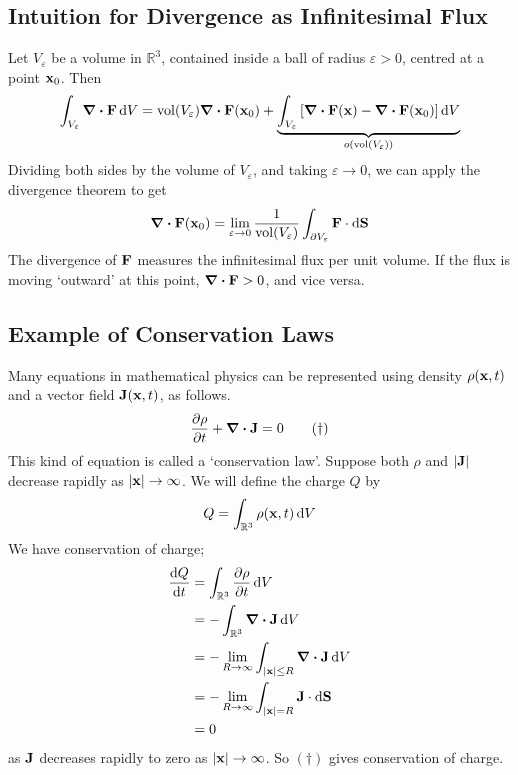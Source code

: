 \documentclass{article}
\begin{document}
\subsection{Intuition for Divergence as Infinitesimal Flux}
Let $V_\varepsilon$ be a volume in $\mathbb R^3$, contained inside a ball of radius $\varepsilon > 0$, centred at a point $\vb x_0$. Then
\[ \int_{V_\varepsilon} \div{\vb F} \dd{V} = \mathrm{vol}(V_\varepsilon) \div{\vb F}(\vb x_0) + \underbrace{\int_{V_\varepsilon}  \left[ \div{\vb F}(\vb x) - \div{\vb F}(\vb x_0) \right] \dd{V}}_{o(\mathrm{vol}(V_\varepsilon))} \]
Dividing both sides by the volume of $V_\varepsilon$, and taking $\varepsilon \to 0$, we can apply the divergence theorem to get
\[ \div{\vb F}(\vb x_0) = \lim_{\varepsilon \to 0} \frac{1}{\mathrm{vol}(V_\varepsilon)} \int_{\partial V_\varepsilon} \vb F \cdot \dd{\vb S} \]
The divergence of $\vb F$ measures the infinitesimal flux per unit volume. If the flux is moving `outward' at this point, $\div{\vb F} > 0$, and vice versa.

\subsection{Example of Conservation Laws}
Many equations in mathematical physics can be represented using density $\rho(\vb x, t)$ and a vector field $\vb J(\vb x, t)$, as follows.
\begin{equation}
    \pdv{\rho}{t} + \div{\vb J} = 0 \tag{$\dagger$}
\end{equation}
This kind of equation is called a `conservation law'. Suppose both $\rho$ and $\abs{\vb J}$ decrease rapidly as $\abs{\vb x} \to \infty$. We will define the charge $Q$ by
\[ Q = \int_{\mathbb R^3} \rho(\vb x, t) \dd{V} \]
We have conservation of charge;
\begin{align*}
    \dv{Q}{t} & = \int_{\mathbb R^3} \pdv{\rho}{t} \dd{V}                            \\
              & = -\int_{\mathbb R^3} \div{\vb J} \dd{V}                             \\
              & = -\lim_{R \to \infty} \int_{\abs{\vb x} \leq R} \div{\vb J} \dd{V}  \\
              & = -\lim_{R \to \infty} \int_{\abs{\vb x} = R} \vb J \cdot \dd{\vb S} \\
              & = 0                                                                  \\
\end{align*}
as $\vb J$ decreases rapidly to zero as $\abs{\vb x} \to \infty$. So $(\dagger)$ gives conservation of charge.
\end{document}
